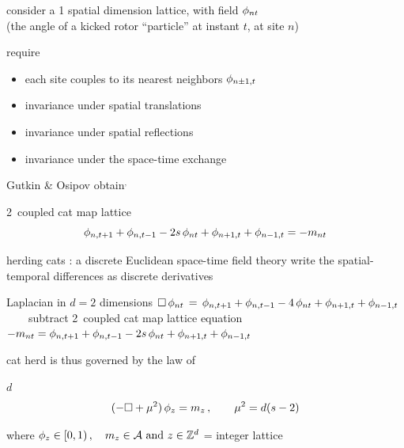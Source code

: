 \begin{frame}{\catlatt}
consider
a 1 {\color{blue}spatial} dimension lattice, with field
$\phi_{nt}$ \\
(the angle of a kicked
rotor ``particle'' at instant $t$, at site $n$)
\begin{block}{require}
\begin{itemize}
\item  each site couples to
its nearest neighbors $\phi_{n\pm1,t}$
\item  invariance under
spatial translations
\item  invariance under spatial reflections
\item  invariance under the space-time exchange
\end{itemize}
\end{block}

\bigskip

Gutkin \& Osipov obtain${}^,$
\begin{block}{2\dmn\ coupled cat map lattice}
\[
\phi_{n,t+1} + \phi_{n,t-1} - 2s \, \phi_{n t} + \phi_{n+1,t} + \phi_{n-1, t}
     =-{m_{n t}}
\] %
\end{block}
\end{frame} %

\begin{frame}{herding cats : a discrete Euclidean space-time field theory}
write the spatial-temporal differences as discrete derivatives
\begin{block}{Laplacian in %
              $d=2$ dimensions}
\(
\Box\,\phi_{nt} \,=\, \phi_{n,t+1} + \phi_{n,t-1}
- 4 \, \phi_{nt} + \phi_{n+1,t} + \phi_{n-1, t}
\)\\
~~~~{\scriptsize subtract 2\dmn\ coupled cat map lattice equation}\\
\(
-{m_{n t}}
 =
\phi_{n,t+1} + \phi_{n,t-1} - 2s \, \phi_{n t} + \phi_{n+1,t} + \phi_{n-1, t}
\) %
\end{block}

\bigskip

{\color{blue}cat herd} is thus governed by the law of
\begin{block}{$d$\dmn\ \catlatt}
\[
 (-\Box + {\mu}^2)\,\phi_{z} = m_z
\,, \qquad
{\mu}^2= d(s-2)
\] %

\medskip

\end{block}

\bigskip

where
\(
  \phi_{z} \in [0,1)
    \,, \quad
  {\ensuremath{m_{z}}} \in \mathcal{A}
    \mbox{  and  }
  z\in \mathbb{Z}^{d}
\) = integer lattice
\end{frame} %

